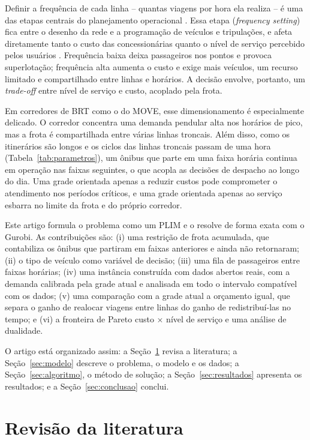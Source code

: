 \documentclass[11pt,a4paper]{article}
\begin{document}
Definir a frequência de cada linha -- quantas viagens por hora ela realiza -- é
uma das etapas centrais do planejamento operacional \citep{ceder2016}. Essa
etapa (\emph{frequency setting}) fica entre o desenho da rede e a programação de
veículos e tripulações, e afeta diretamente tanto o custo das concessionárias
quanto o nível de serviço percebido pelos usuários \citep{schmidt2024}.
Frequência baixa deixa passageiros nos pontos e provoca superlotação; frequência
alta aumenta o custo e exige mais veículos, um recurso limitado e compartilhado
entre linhas e horários. A decisão envolve, portanto, um \emph{trade-off} entre
nível de serviço e custo, acoplado pela frota.

Em corredores de BRT como o do MOVE, esse dimensionamento é especialmente
delicado. O corredor concentra uma demanda pendular alta nos horários de pico,
mas a frota é compartilhada entre várias linhas troncais. Além disso, como os
itinerários são longos e os ciclos das linhas troncais passam de uma hora
(Tabela~\ref{tab:parametros}), um ônibus que parte em uma faixa horária continua
em operação nas faixas seguintes, o que acopla as decisões de despacho ao longo
do dia. Uma grade orientada apenas a reduzir custos pode comprometer o
atendimento nos períodos críticos, e uma grade orientada apenas ao serviço
esbarra no limite da frota e do próprio corredor.

Este artigo formula o problema como um PLIM e o resolve de forma exata com o
Gurobi. As contribuições são: (i) uma restrição de frota acumulada, que
contabiliza os ônibus que partiram em faixas anteriores e ainda não retornaram;
(ii) o tipo de veículo como variável de decisão; (iii) uma fila de passageiros
entre faixas horárias; (iv) uma instância construída com dados abertos reais,
com a demanda calibrada pela grade atual e analisada em todo o intervalo
compatível com os dados; (v) uma comparação com a grade atual a orçamento
igual, que separa o ganho de realocar viagens entre linhas do ganho de
redistribuí-las no tempo; e (vi) a fronteira de Pareto custo $\times$ nível de
serviço e uma análise de dualidade.

O artigo está organizado assim: a Seção~\ref{sec:revisao} revisa a literatura; a
Seção~\ref{sec:modelo} descreve o problema, o modelo e os dados; a
Seção~\ref{sec:algoritmo}, o método de solução; a Seção~\ref{sec:resultados}
apresenta os resultados; e a Seção~\ref{sec:conclusao} conclui.

\section{Revisão da literatura}\label{sec:revisao}
\end{document}
